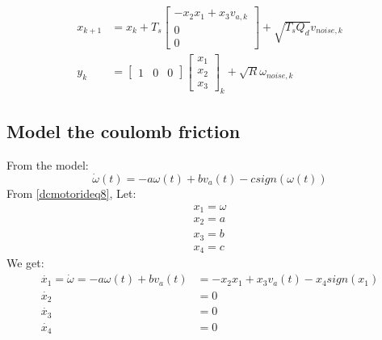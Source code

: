 	\begin{tcolorbox}[title=Discretized nonlinear stochastic system in matrix form]
		\begin{equation}
			\begin{split}
					x_{k+1} &= x_k + T_s
					\begin{bmatrix}
						-x_2 x_1 + x_3 v_{a,k} \\
						0                      \\
						0                      
					\end{bmatrix} +\sqrt{T_s Q_d}v_{noise,k}\\
					y_k &= 
					\begin{bmatrix}
						1 & 0 & 0 
					\end{bmatrix}
					\begin{bmatrix}
						x_1 \\
						x_2 \\
						x_3 
					\end{bmatrix}_k+\sqrt{R}\omega_{noise,k}
			\end{split}
			\label{dcmotorideq7}
		\end{equation}
	\end{tcolorbox}
	

\subsection{Model the coulomb friction}
	From the model:
	\begin{equation}
		\dot{\omega}(t) = - a \omega(t) + b v_a(t) - csign(\omega(t))
		\label{dcmotorideq8}
	\end{equation}
	From \autoref{dcmotorideq8}, Let:
	\begin{equation}
		\begin{split}
			x_1 = \omega\\
			x_2 = a\\
			x_3 = b\\
			x_4 = c
		\end{split}
		\label{dcmotorideq9}
	\end{equation}
	We get:
	\begin{equation}
		\begin{split}
			\dot{x_1} = \dot{\omega} = - a \omega(t) + b v_a(t) &= -x_2 x_1 + x_3 v_a(t) - x_4sign(x_1)  \\
			\dot{x_2} &= 0 \\
			\dot{x_3} &= 0 \\
			\dot{x_4} &= 0
		\end{split}
		\label{dcmotorideq10}
	\end{equation}

